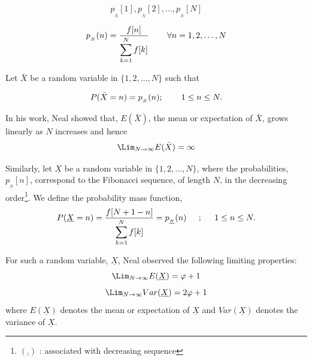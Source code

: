 \begin{multicols}{2}
\vspace{-.6cm}

$$
p_{_{\bar{N}}}[1], p_{_{\bar{N}}}[2], \ldots, p_{_{\bar{N}}}[N]
$$

\vspace{-.2cm}

\begin{equation}
 p_{_{\bar{N}}}(n) = \frac{f[n]}{\displaystyle{\sum_{k =1}^N f[k]}} \hspace{0.3in} \forall n = 1, 2, \ldots, N \label{eq-2.3}
 \end{equation}

\vspace{-.2cm}

Let $\bar{X}$ be a random variable in $\{1,2, \ldots, N\}$ such that  

\vspace{-.2cm} 
 
\begin{equation}
P(\bar{X} = n) = p_{_{\bar{N}}}(n); \hspace{0.3in} 1 \leq n\leq N.\label{eq-2.4}
\end{equation}
 
\vspace{-.2cm} 
 
In his work, Neal \cite{art1-key01} showed that, $E(\bar{X})$, the mean or expectation of $\bar{X}$, grows linearly as $N$ increases and hence 
\begin{equation}
\Lim_{N\rightarrow \infty} E(\bar{X}) = \infty\label{eq-2.5}
\end{equation} 

\vspace{-.4cm} 

Similarly, let $\underline{X}$ be a random variable in $\{1,2, \ldots, N\}$, where the probabilities, $p_{_{\underline{N}}}[n]$, correspond to the Fibonacci sequence, of length $N$, in the decreasing order\footnote{${(\underline{.})}$ : associated with decreasing sequence}. We define the probability mass function,
\begin{equation}
P(\underline{X} = n) = \frac{f[N+1-n]}{\displaystyle{\sum_{k =1}^N f[k]}} = p_{_{\underline{N}}}(n) \hspace{0.2in} ; \hspace{0.2in} 1 \leq n\leq N.\label{eq-2.6}
 \end{equation}

For such a random variable, $\underline{X}$, Neal \cite{art1-key01} observed the following limiting properties:
\begin{equation}
\Lim_{N\rightarrow \infty} E(\underline{X}) = \varphi + 1\label{eq-2.7}
\end{equation}
\begin{equation}
\Lim_{N\rightarrow \infty} Var(\underline{X}) = 2\varphi + 1\label{eq-2.8}
\end{equation}
where $E(\underline{X})$ denotes the mean or expectation of $\underline{X}$ and $Var(\underline{X})$ denotes the variance of $\underline{X}$.


\end{multicols}
